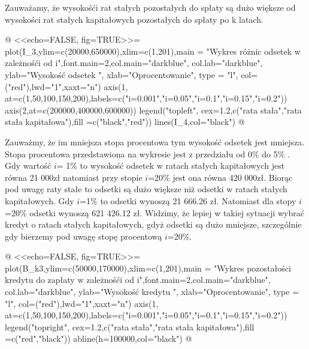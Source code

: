 \documentclass{article}
\begin{document}
\begin{center}
\bigskip

Zauważamy, że wysokośći rat stałych pozostałych do spłaty są dużo większe od wysokości rat stałych kapitałowych pozostałych do spłaty po k latach.
\noindent{\large\textbf{}}


\bigskip
\noindent{\large\textbf{}}


\bigskip

\noindent{\large\textbf{}}
\noindent{\large\textbf{}}


\bigskip

\noindent{\large\textbf{}}


\bigskip


\bigskip
{}
@
<<echo=FALSE, fig=TRUE>>=
plot(I_3,ylim=c(20000,650000),xlim=c(1,201),main = "Wykres różnic odsetek w zależnośći od i",font.main=2,col.main="darkblue", col.lab="darkblue", ylab="Wysokość odsetek ", xlab="Oprocentowanie", type = "l", col=("red"),lwd="1",xaxt="n")
axis(1, at=c(1,50,100,150,200),labels=c("i=0.001","i=0.05","i=0.1","i=0.15","i=0.2"))
axis(2,at=c(200000,400000,600000))
legend("topleft", cex=1.2,c("rata stała","rata stała kapitałowa"),fill =c("black","red"))
lines(I_4,col="black")
@
\bigskip

Zauważmy, że im mniejsza stopa procentowa tym wysokość odsetek jest mniejsza. Stopa procentowa  przedstawiona na wykresie jest z przedziału od 0\% do 5\% .
Gdy wartość $i$= 1\% to wysokość odsetek w ratach stałych kapitałowych jest równa 21 000zł natomiast przy stopie $i$=20\% jest ona równa 420 000zł. Biorąc pod uwagę raty stałe to odsetki są dużo większe niż odsetki w ratach stałych kapitałowych. Gdy $i$=1\% to odsetki wynoszą 21 666.26 zł. Natomiast dla stopy $i$=20\%  odsetki wynoszą 621 426.12 zł. Widzimy, że lepiej w takiej sytuacji wybrać kredyt o ratach stałych kapitałowych, gdyż odsetki są dużo mniejsze, szczególnie gdy bierzemy pod uwagę stopę procentową $i$=20\%.

\noindent{\large\textbf{}}
\bigskip
\noindent{\large\textbf{}}


\bigskip


\noindent{\large\textbf{}}
\noindent{\large\textbf{}}


\bigskip


\noindent{\large\textbf{}}

\bigskip
{}
@
<<echo=FALSE, fig=TRUE>>=
plot(B_k3,ylim=c(50000,170000),xlim=c(1,201),main = "Wykres pozostałości kredytu do zapłaty w zależnośći od i",font.main=2,col.main="darkblue", col.lab="darkblue", ylab="Wysokość kredytu ", xlab="Oprocentowanie", type = "l", col=("red"),lwd="1",xaxt="n")
axis(1, at=c(1,50,100,150,200),labels=c("i=0.001","i=0.05","i=0.1","i=0.15","i=0.2"))
legend("topright", cex=1.2,c("rata stała","rata stała kapitałowa"),fill =c("red","black"))
abline(h=100000,col="black")
@
\bigskip


\end{center}
\end{document}

